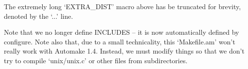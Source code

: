 The extremely long `EXTRA\_{}DIST' macro above has be truncated for brevity, denoted by the `...' line.

Note that we no longer define INCLUDES -- it is now automatically defined by configure. Note also that, due to a small technicality, this `Makefile.am' won't really work with Automake 1.4. Instead, we must modify things so that we don't try to compile `unix/unix.c' or other files from subdirectories. 

